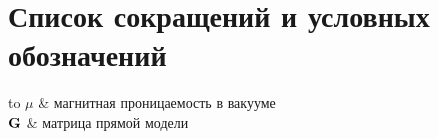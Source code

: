 \chapter*{Список сокращений и условных обозначений}             %
\noindent
\begin{longtabu} to \textwidth {r X}
    $\mu$  & магнитная проницаемость в вакууме\\
    $\mathbf{G}$ & матрица прямой модели\\


\end{longtabu}
